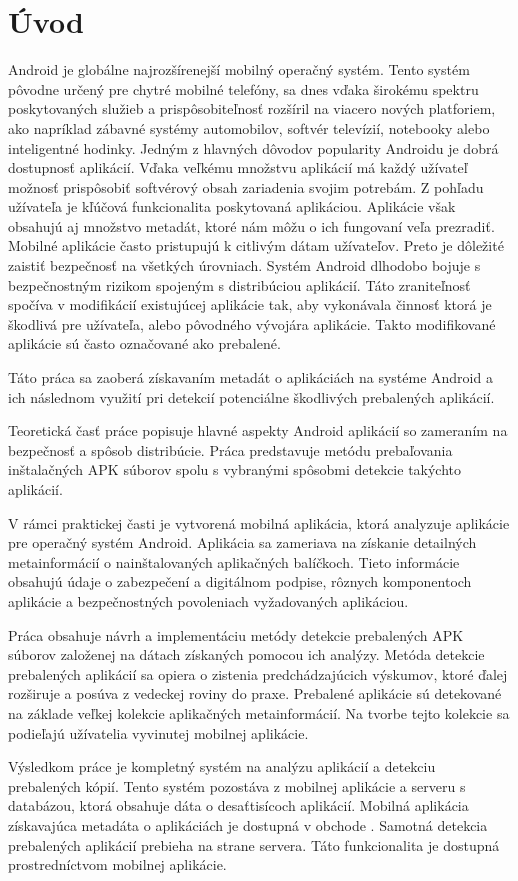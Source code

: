 \chapter{Úvod}
Android je globálne najrozšírenejší mobilný operačný systém. Tento systém pôvodne určený pre chytré mobilné telefóny, sa dnes vďaka širokému spektru poskytovaných služieb a prispôsobiteľnosť rozšíril na viacero nových platforiem, ako napríklad zábavné systémy automobilov, softvér televízií, notebooky alebo inteligentné hodinky. Jedným z hlavných dôvodov popularity Androidu je dobrá dostupnosť aplikácií. Vďaka veľkému množstvu aplikácií má každý užívateľ možnosť prispôsobiť softvérový obsah zariadenia svojim potrebám. Z pohľadu užívateľa je kľúčová funkcionalita poskytovaná aplikáciou. Aplikácie však obsahujú aj množstvo metadát, ktoré nám môžu o ich fungovaní veľa prezradiť. Mobilné aplikácie často pristupujú k citlivým dátam užívateľov. Preto je dôležité zaistiť bezpečnosť na všetkých úrovniach. Systém Android dlhodobo bojuje s bezpečnostným rizikom spojeným s distribúciou aplikácií. Táto zraniteľnosť spočíva v modifikácií existujúcej aplikácie tak, aby vykonávala činnosť ktorá je škodlivá pre užívateľa, alebo pôvodného vývojára aplikácie. Takto modifikované aplikácie sú často označované ako prebalené.

Táto práca sa zaoberá získavaním metadát o aplikáciách na systéme Android a ich následnom využití pri detekcií potenciálne škodlivých prebalených aplikácií.

Teoretická časť práce popisuje hlavné aspekty Android aplikácií so zameraním na bezpečnosť a spôsob distribúcie. Práca predstavuje metódu prebaľovania inštalačných APK súborov spolu s vybranými spôsobmi detekcie takýchto aplikácií.

V rámci praktickej časti je vytvorená mobilná aplikácia, ktorá analyzuje aplikácie pre operačný systém Android. Aplikácia sa zameriava na získanie detailných metainformácií o nainštalovaných aplikačných balíčkoch. Tieto informácie obsahujú údaje o zabezpečení a digitálnom podpise, rôznych komponentoch aplikácie a bezpečnostných povoleniach vyžadovaných aplikáciou.

Práca obsahuje návrh a implementáciu metódy detekcie prebalených APK súborov založenej na dátach získaných pomocou ich analýzy. Metóda detekcie prebalených aplikácií sa opiera o zistenia predchádzajúcich výskumov, ktoré ďalej rozširuje a posúva z vedeckej roviny do praxe. Prebalené aplikácie sú detekované na základe veľkej kolekcie aplikačných metainformácií. Na tvorbe tejto kolekcie sa podieľajú užívatelia vyvinutej mobilnej aplikácie.  

Výsledkom práce je kompletný systém na analýzu aplikácií a detekciu prebalených kópií. Tento systém pozostáva z mobilnej aplikácie a serveru s databázou, ktorá obsahuje dáta o desaťtisícoch aplikácií. Mobilná aplikácia získavajúca metadáta o aplikáciách je dostupná v obchode . Samotná detekcia prebalených aplikácií prebieha na strane servera. Táto funkcionalita je dostupná prostredníctvom mobilnej aplikácie.

